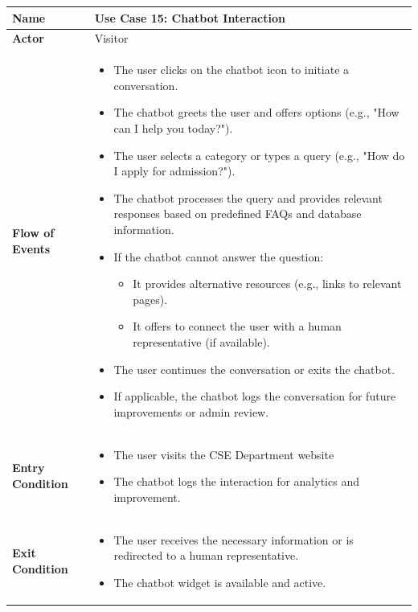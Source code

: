 \documentclass[11pt]{article}
\begin{document}
\begin{center}
\begin{tabular}{ | >{\bfseries}m{6em} | m{10cm} | }
  \hline
  \textbf{Name} & Use Case 15: Chatbot Interaction \\
  \hline
  \textbf{Actor} & Visitor \\
  \hline
  \textbf{Flow of Events} & 
  \begin{itemize}
      \item The user clicks on the chatbot icon to initiate a conversation.
      \item The chatbot greets the user and offers options (e.g., "How can I help you today?").
      \item The user selects a category or types a query (e.g., "How do I apply for admission?").
      \item The chatbot processes the query and provides relevant responses based on predefined FAQs and database information.
      \item If the chatbot cannot answer the question:
      \begin{itemize}
          \item It provides alternative resources (e.g., links to relevant pages).
          \item It offers to connect the user with a human representative (if available).
      \end{itemize}
      \item The user continues the conversation or exits the chatbot.
      \item If applicable, the chatbot logs the conversation for future improvements or admin review.
  \end{itemize} \\
  \hline
  \textbf{Entry Condition} & 
  \begin{itemize}
  \item The user visits the CSE Department website 
  \item The chatbot logs the interaction for analytics and improvement.
    \end{itemize}  \\
  \hline
  \textbf{Exit Condition} & 
  \begin{itemize}
  \item The user receives the necessary information or is redirected to a human representative. 
  \item The chatbot widget is available and active.
    \end{itemize}  \\
  \hline
\end{tabular}
\end{center}
\end{document}
